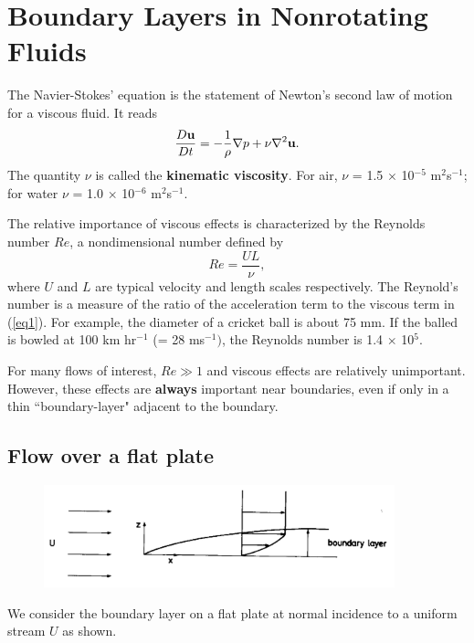 \documentclass[twoside,a4paper,11pt]{report}
\begin{document}
\cleardoublepage


\chapter{Boundary Layers in Nonrotating Fluids}
The Navier-Stokes' equation is the statement of Newton's second law of 
motion for a viscous fluid. It reads
\begin{equation}
\label{eq1}
\frac{D{{\bf u}}}{Dt}=-\frac{1}{\rho }\nabla p+\nu \nabla ^2{{\bf 
u}}.
\end{equation}
The quantity $\nu $ is called the \textbf{kinematic viscosity}. For air, 
$\nu $ = 1.5 $\times $ 10$^{-5}$ m$^{2}$s$^{-1}$; for water $\nu $ = 1.0 
$\times $ 10$^{-6}$ m$^{2}$s$^{-1}$.

The relative importance of viscous effects is characterized by the Reynolds 
number $Re$, a nondimensional number defined by
\[
Re=\frac{UL}{\nu },
\]
where $U$ and $L$ are typical velocity and length scales respectively. The 
Reynold's number is a measure of the ratio of the acceleration term to the 
viscous term in (\ref{eq1}). For example, the diameter of a cricket ball 
is about 75 mm. If the balled is bowled at 100 km hr$^{-1}$ (= 28 
ms$^{-1})$, the Reynolds number is 1.4 $\times $ 10$^{5}$. 

For many flows of interest, $Re \gg 1$ and viscous effects are relatively 
unimportant. However, these effects are \textbf{always} important near 
boundaries, even if only in a thin ``boundary-layer" adjacent to the 
boundary.

\section{Flow over a flat plate}
\begin{figure}[htbp]
\centerline{\includegraphics[width=4in]{Section61.pdf}}
\label{fig1}
\end{figure}

We consider the boundary layer on a flat plate at normal incidence to a 
uniform stream $U$ as shown.
\end{document}
